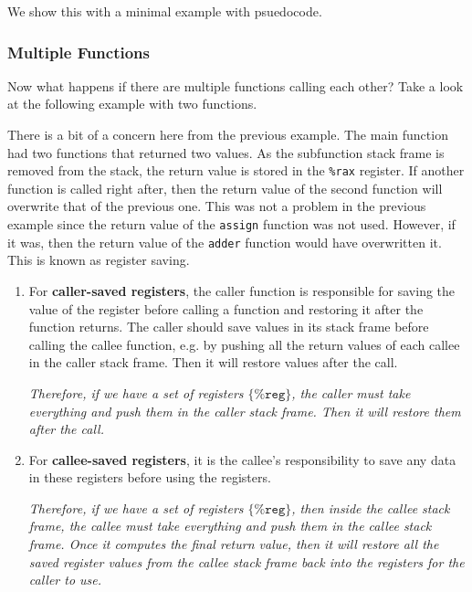 \documentclass{article}
\begin{document}
      \begin{example}
        We show this with a minimal example with psuedocode. 
      \end{example}

    \subsubsection{Multiple Functions}

      Now what happens if there are multiple functions calling each other? Take a look at the following example with two functions. 

      \begin{example}
        
      \end{example}

      There is a bit of a concern here from the previous example. The main function had two functions that returned two values. As the subfunction stack frame is removed from the stack, the return value is stored in the \texttt{\%rax} register. If another function is called right after, then the return value of the second function will overwrite that of the previous one. This was not a problem in the previous example since the return value of the \texttt{assign} function was not used. However, if it was, then the return value of the \texttt{adder} function would have overwritten it. This is known as register saving. 
      \begin{enumerate}
        \item For \textbf{caller-saved registers}, the caller function is responsible for saving the value of the register before calling a function and restoring it after the function returns. The caller should save values in its stack frame before calling the callee function, e.g. by pushing all the return values of each callee in the caller stack frame. Then it will restore values after the call. 

        \begin{center}
          \textit{Therefore, if we have a set of registers $\{\texttt{\%reg}\}$, the caller must take everything and push them in the caller stack frame. Then it will restore them after the call.}
        \end{center}

        \item For \textbf{callee-saved registers}, it is the callee's responsibility to save any data in these registers before using the registers. 

          \begin{center} 
            \textit{Therefore, if we have a set of registers $\{\texttt{\%reg}\}$, then inside the callee stack frame, the callee must take everything and push them in the callee stack frame. Once it computes the final return value, then it will restore all the saved register values from the callee stack frame back into the registers for the caller to use.}
          \end{center}
      \end{enumerate}
\end{document}

